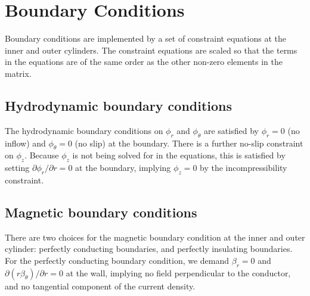 \documentclass[letterpaper]{article}
\begin{document}
\section{Boundary Conditions}

Boundary conditions are implemented by a set of constraint equations at the inner and outer cylinders. The constraint equations are scaled so that the terms in the equations are of the same order as the other non-zero elements in the matrix.

\subsection{Hydrodynamic boundary conditions}

The hydrodynamic boundary conditions on $\phi_r$ and $\phi_\theta$ are satisfied by $\phi_r = 0$ (no inflow) and $\phi_\theta = 0$ (no slip) at the boundary.  There is a further no-slip constraint on $\phi_z$.  Because $\phi_z$ is not being solved for in the equations, this is satisfied by setting $\partial \phi_r/\partial r = 0$ at the boundary, implying $\phi_z=0$ by the incompressibility constraint.

\subsection{Magnetic boundary conditions}

There are two choices for the magnetic boundary condition at the inner and outer cylinder: perfectly conducting boundaries, and perfectly insulating boundaries.  For the perfectly conducting boundary condition, we demand $\beta_r = 0$ and $\partial (r \beta_\theta)/\partial r = 0$ at the wall, implying no field perpendicular to the conductor, and no tangential component of the current density. 
\end{document}
